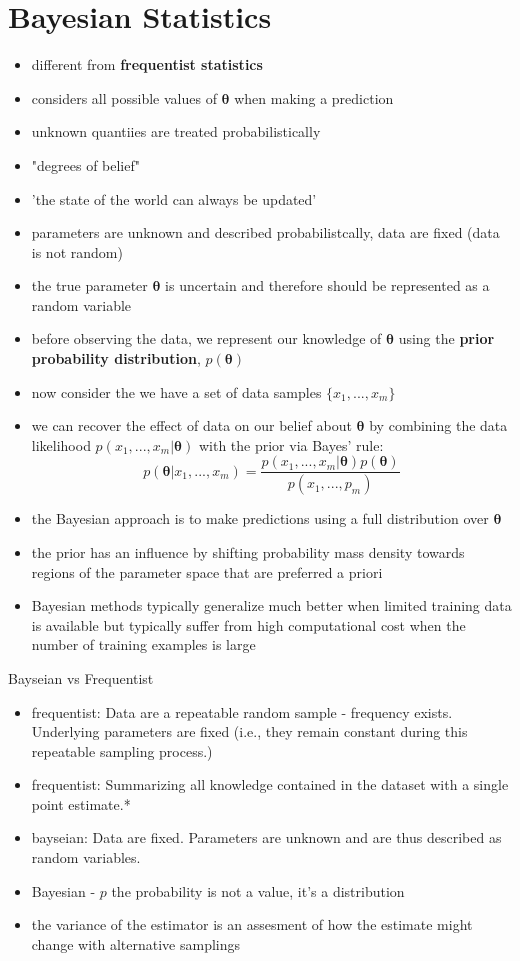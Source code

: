 \documentclass[11pt, twocolumn]{report}
\def\parameter{\bm{\theta}}
\begin{document}
\section{Bayesian Statistics}
\begin{itemize}
  \item different from \textbf{frequentist statistics}
  \item considers all possible values of $\parameter$ when making a prediction
  \item unknown quantiies are treated probabilistically 
  \item "degrees of belief"
  \item 'the state of the world can always be updated'
  \item parameters are unknown and described probabilistcally, data are fixed
    (data is not random)
  \item the true parameter $\parameter$ is uncertain and therefore should be
    represented as a random variable
  \item before observing the data, we represent our knowledge of $\parameter$
    using the \textbf{prior probability distribution}, $p(\parameter)$
  \item now consider the we have a set of data samples $\{x_1,...,x_m\}$
  \item we can recover the effect of data on our belief about $\parameter$ by
    combining the data likelihood $p(x_1,...,x_m | \parameter)$ with the prior
    via Bayes' rule:
    \begin{equation}
      p(\parameter | x_1,...,x_m) = \frac{p(x_1,...,x_m |
        \parameter)p(\parameter)}{p(x_1,...,p_m)}
    \end{equation}
  \item the Bayesian approach is to make predictions using a full distribution
    over $\parameter$ 
  \item the prior has an influence by shifting probability mass density towards
    regions of the parameter space that are preferred a priori
  \item Bayesian methods typically generalize much better when limited training
    data is available but typically suffer from high computational cost when
    the number of training examples is large
\end{itemize}

Bayseian vs Frequentist
\begin{itemize}
  \item frequentist: Data are a repeatable random sample - frequency exists.
    Underlying parameters are fixed (i.e., they remain constant during this
    repeatable sampling process.)
  \item frequentist: Summarizing all knowledge contained in the dataset with a
    single point estimate.*
  \item bayseian: Data are fixed. Parameters are unknown and are thus described
    as random variables.
  \item Bayesian - $p$ the probability is not a value, it's a distribution
  \item the variance of the estimator is an assesment of how the estimate might
    change with alternative samplings
\end{itemize}
\end{document}
